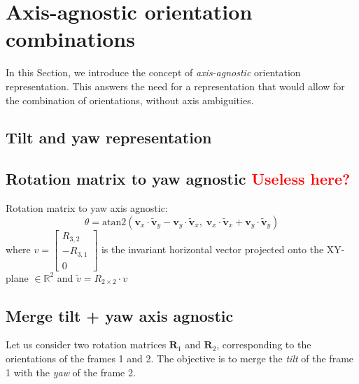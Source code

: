 \documentclass{IJCAS}
\begin{document}
\section{Axis-agnostic orientation combinations}
In this Section, we introduce the concept of \emph{axis-agnostic} orientation representation. This answers the need for a representation that would allow for the combination of orientations, without axis ambiguities. 

\subsection{Tilt and yaw representation}

\subsection{Rotation matrix to yaw agnostic \textcolor{red}{Useless here?}}

Rotation matrix to yaw axis agnostic:
\begin{equation}
\theta = \mathrm{atan2}\left( \boldsymbol{v}_x \cdot \tilde{\boldsymbol{v}}_y - \boldsymbol{v}_y \cdot \tilde{\boldsymbol{v}}_x,\; \boldsymbol{v}_x \cdot \tilde{\boldsymbol{v}}_x + \boldsymbol{v}_y \cdot \tilde{\boldsymbol{v}}_y \right)
\end{equation}
where $v=\begin{bmatrix}
R_{3,2} \\
- R_{3,1} \\
0
\end{bmatrix}$ is the invariant horizontal vector projected onto the XY-plane $\in \mathbb{R}^2$ and $\tilde{v} = R_{2\times2} \cdot v$

\subsection{Merge tilt + yaw axis agnostic}

Let us consider two rotation matrices $\boldsymbol{R}_{1}$ and $\boldsymbol{R}_{2}$, corresponding to the orientations of the frames 1 and 2. The objective is to merge the \emph{tilt} of the frame 1 with the \emph{yaw} of the frame 2.
\end{document}
